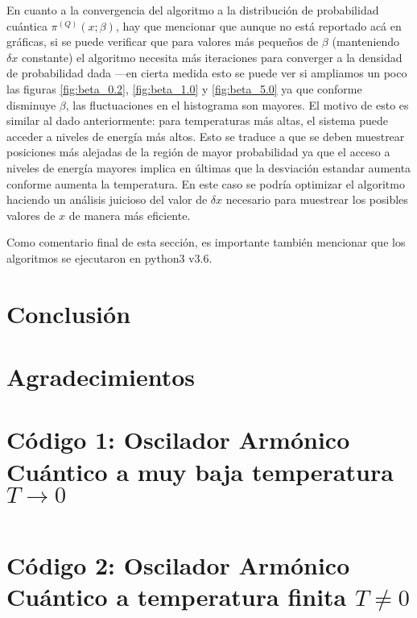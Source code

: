 \documentclass[%
 reprint,
 amsmath,amssymb,
 aps,
 pra,
]{revtex4-2}
\begin{document}
En cuanto a la convergencia del algoritmo a la distribución de probabilidad cuántica $\pi^{(Q)}(x;\beta)$, hay que mencionar que aunque no está reportado acá en gráficas, si se puede verificar que para valores más pequeños de $\beta$ (manteniendo $\delta x$ constante) el algoritmo necesita más iteraciones para converger a la densidad de probabilidad dada —en cierta medida esto se puede ver si ampliamos un poco las figuras \ref{fig:beta_0.2}, \ref{fig:beta_1.0} y \ref{fig:beta_5.0} ya que conforme disminuye $\beta$, las fluctuaciones en el histograma son mayores. El motivo de esto es similar al dado anteriormente: para temperaturas más altas, el sistema puede acceder a niveles de energía más altos. Esto se traduce a que se deben muestrear posiciones más alejadas de la región de mayor probabilidad ya que el acceso a niveles de energía mayores implica en últimas que la desviación estandar aumenta conforme aumenta la temperatura. En este caso se podría optimizar el algoritmo haciendo un análisis juicioso del valor de $\delta x$ necesario para muestrear los posibles valores de $x$ de manera más eficiente.

Como comentario final de esta sección, es importante también mencionar que los algoritmos se ejecutaron en python3 v3.6.

\section{Conclusión\label{Conclusiones}}

\section*{Agradecimientos}

\newpage

\appendix

\begin{widetext}

\section{Código 1: Oscilador Armónico Cuántico a muy baja temperatura \texorpdfstring{$T \rightarrow 0$}{T tendiendo a cero}\label{appx:codigo_baja_temperatura}}

\inputminted[linenos,breaklines]{python}{code_1.py}

\section{Código 2: Oscilador Armónico Cuántico a temperatura finita \texorpdfstring{$T \neq 0$}{T diferente de cero}\label{appx:codigo_temperatura_finita}}

\inputminted[linenos,breaklines]{python}{code_2.py}

\end{widetext}




\nocite{*}

\end{document}
